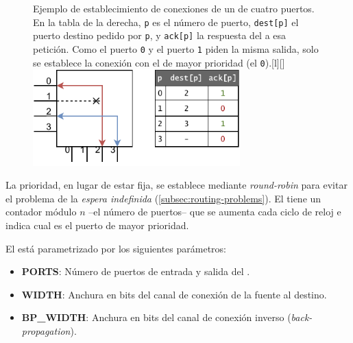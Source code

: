 \begin{figure}[h]
    \begin{captionbeside}{Ejemplo de establecimiento de conexiones de un  de cuatro puertos. En la tabla de la derecha, \texttt{p} es el número de puerto, \texttt{dest[p]} el puerto destino pedido por \texttt{p}, y \texttt{ack[p]} la respuesta del  a esa petición. Como el puerto \texttt{0} y el puerto \texttt{1} piden la misma salida, solo se establece la conexión con el de mayor prioridad (el \texttt{0}).}[l][\linewidth]
        \includegraphics[width=8cm]{images/diagrams/sample_crossbar.drawio.pdf}%
    \end{captionbeside}

    \label{fig:crossbar_example}
\end{figure}

La prioridad, en lugar de estar fija, se establece mediante \textit{round-robin} para evitar el problema de la \textit{espera indefinida} (\autoref{subsec:routing-problems}). El  tiene un contador módulo $n$ --el número de puertos-- que se aumenta cada ciclo de reloj e indica cual es el puerto de mayor prioridad.

El  está parametrizado por los siguientes parámetros:
\begin{itemize}[nosep]
    \item \textbf{PORTS}: Número de puertos de entrada y salida del .%
    \item \textbf{WIDTH}: Anchura en bits del canal de conexión de la fuente al destino.
    \item \textbf{BP\_WIDTH}: Anchura en bits del canal de conexión inverso (\textit{back-propagation}).
\end{itemize}

